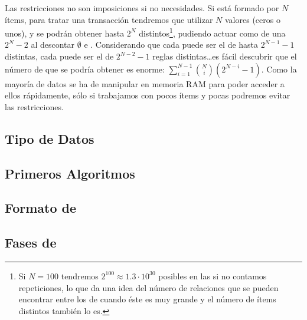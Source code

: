 Las restricciones no son imposiciones si no necesidades. Si \I está formado por $N$ ítems, para tratar una transacción tendremos que utilizar $N$ valores (ceros o unos), y se podrán obtener hasta $2^N$ \itemsets distintos\footnote{Si $N=100$ tendremos $2^{100}\approx1.3\cdot10^{30}$ posibles \itemsets en las \transacciones si no contamos repeticiones, lo que da una idea del número de relaciones que se pueden encontrar entre los \itemsets de \D cuando éste es muy grande y el número de ítems distintos también lo es.}, pudiendo actuar como \antecedente de una \ar $2^N-2$ al descontar $\emptyset$ e \I. Considerando que cada \kitemset[1] puede ser el \antecedente de hasta $2^{N-1}-1$ \ars distintas, cada \kitemset[2] puede ser el \antecedente de $2^{N-2}-1$ reglas distintas\ldots es fácil descubrir que el número de \ARs que se podría obtener es enorme: $\sum_{i=1}^{N-1}{{N \choose i}(2^{N-i}-1)}$. Como la mayoría de datos se ha de manipular en memoria RAM para poder acceder a ellos rápidamente, sólo si trabajamos con pocos ítems y pocas \transacciones podremos evitar las restricciones.



\subsection{Tipo de Datos}
\label{sec:arm:tipo-de-datos}




\subsection{Primeros Algoritmos}
\label{sec:arm:primeros-algoritmos}




\subsection{Formato de \D}
\label{sec:arm:formato-de-D}




\subsection{Fases de \ARM}
\label{sec:arm:fases-de-ARM}

